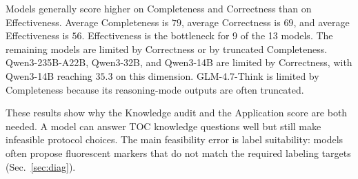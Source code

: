 \documentclass[conference]{IEEEtran}
\begin{document}
Models generally score higher on Completeness and Correctness than on
Effectiveness. Average Completeness is $79$, average Correctness is $69$, and
average Effectiveness is $56$. Effectiveness is the bottleneck for 9 of the 13
models. The remaining models are limited by Correctness or by truncated
Completeness. Qwen3-235B-A22B, Qwen3-32B, and Qwen3-14B are limited by
Correctness, with Qwen3-14B reaching $35.3$ on this dimension. GLM-4.7-Think is
limited by Completeness because its reasoning-mode outputs are often truncated.

These results show why the Knowledge audit and the Application score are both
needed. A model can answer TOC knowledge questions well but still make
infeasible protocol choices. The main feasibility error is label suitability:
models often propose fluorescent markers that do not match the required
labeling targets (Sec.~\ref{sec:diag}).
\end{document}
